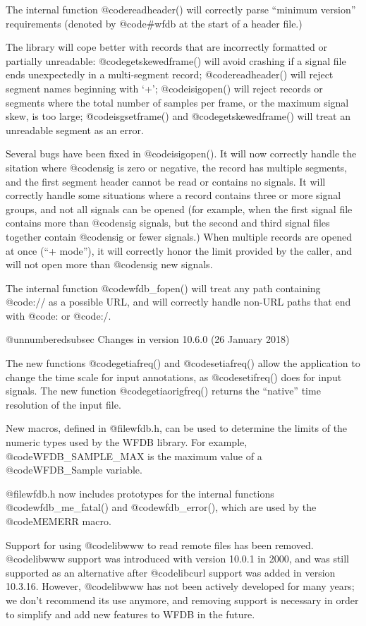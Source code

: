 {{{{{{{{The internal function @code{readheader()} will correctly parse ``minimum
version'' requirements (denoted by @code{#wfdb} at the start of a header file.)

The library will cope better with records that are incorrectly formatted or
partially unreadable: @code{getskewedframe()} will avoid crashing if a signal
file ends unexpectedly in a multi-segment record; @code{readheader()} will
reject segment names beginning with `+'; @code{isigopen()} will reject records
or segments where the total number of samples per frame, or the maximum signal
skew, is too large; @code{isgsetframe()} and @code{getskewedframe()} will treat
an unreadable segment as an error.

Several bugs have been fixed in @code{isigopen()}.  It will now correctly
handle the sitation where @code{nsig} is zero or negative, the record has
multiple segments, and the first segment header cannot be read or contains no
signals.  It will correctly handle some situations where a record contains
three or more signal groups, and not all signals can be opened (for example,
when the first signal file contains more than @code{nsig} signals, but the
second and third signal files together contain @code{nsig} or fewer signals.)
When multiple records are opened at once (``+ mode''), it will correctly honor
the limit provided by the caller, and will not open more than @code{nsig} new
signals.

The internal function @code{wfdb_fopen()} will treat any path containing
@code{://} as a possible URL, and will correctly handle non-URL paths that end
with @code{:} or @code{:/}.

@unnumberedsubsec Changes in version 10.6.0 (26 January 2018)

The new functions @code{getiafreq()} and @code{setiafreq()} allow the
application to change the time scale for input annotations, as
@code{setifreq()} does for input signals.  The new function
@code{getiaorigfreq()} returns the ``native'' time resolution of the input
file.

New macros, defined in @file{wfdb.h}, can be used to determine the limits of
the numeric types used by the WFDB library.  For example,
@code{WFDB_SAMPLE_MAX} is the maximum value of a @code{WFDB_Sample} variable.

@file{wfdb.h} now includes prototypes for the internal functions
@code{wfdb_me_fatal()} and @code{wfdb_error()}, which are used by the
@code{MEMERR} macro.

Support for using @code{libwww} to read remote files has been removed.
@code{libwww} support was introduced with version 10.0.1 in 2000, and was still
supported as an alternative after @code{libcurl} support was added in version
10.3.16.  However, @code{libwww} has not been actively developed for many
years; we don't recommend its use anymore, and removing support is necessary in
order to simplify and add new features to WFDB in the future.

}}}}}}}}
